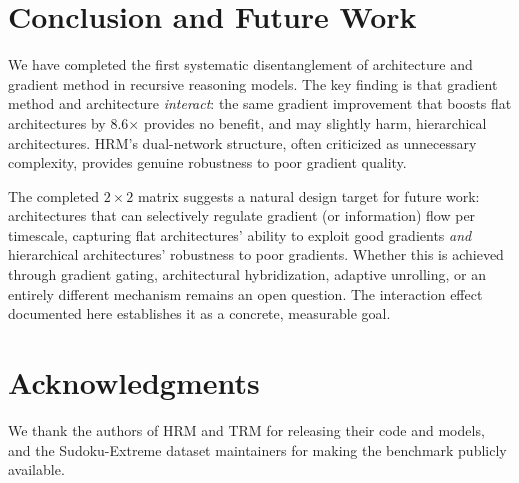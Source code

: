 \documentclass{article}
\begin{document}
\section{Conclusion and Future Work}

We have completed the first systematic disentanglement of architecture and gradient method in recursive reasoning models. The key finding is that gradient method and architecture \emph{interact}: the same gradient improvement that boosts flat architectures by 8.6$\times$ provides no benefit, and may slightly harm, hierarchical architectures. HRM's dual-network structure, often criticized as unnecessary complexity, provides genuine robustness to poor gradient quality.

The completed $2\times2$ matrix suggests a natural design target for future work: architectures that can selectively regulate gradient (or information) flow per timescale, capturing flat architectures' ability to exploit good gradients \emph{and} hierarchical architectures' robustness to poor gradients. Whether this is achieved through gradient gating, architectural hybridization, adaptive unrolling, or an entirely different mechanism remains an open question. The interaction effect documented here establishes it as a concrete, measurable goal.

\section*{Acknowledgments}

We thank the authors of HRM and TRM for releasing their code and models, and the Sudoku-Extreme dataset maintainers for making the benchmark publicly available.



\end{document}
